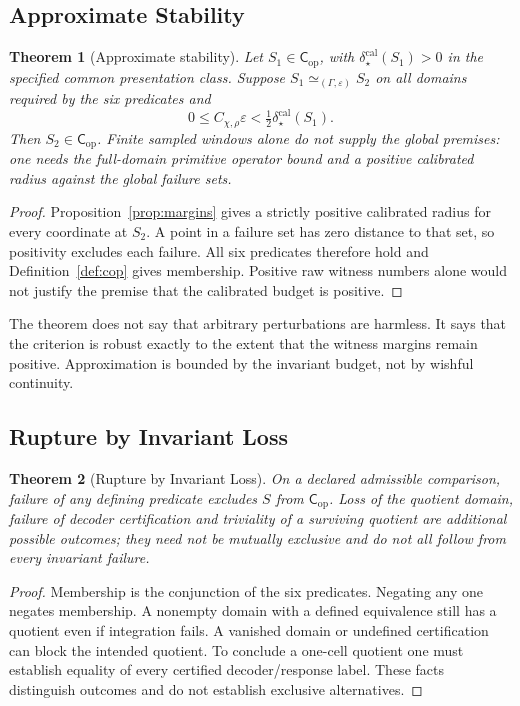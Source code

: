 \documentclass[11pt,a4paper]{article}
\newtheorem{theorem}{Theorem}[section]
\theoremstyle{definition}
\newcommand{\Cop}{\mathsf{C}_{\mathrm{op}}}
\newcommand{\eps}{\varepsilon}
\begin{document}
\subsection{Approximate Stability}
\begin{theorem}[Approximate stability]\label{thm:stability}
Let $S_1\in\Cop$, with $\delta_\star^{\mathrm{cal}}(S_1)>0$ in the specified common presentation class. Suppose $S_1\simeq_{(\Gamma,\eps)}S_2$ on all domains required by the six predicates and
\[
 0\le C_{\chi,\rho}\eps<\tfrac12\delta_\star^{\mathrm{cal}}(S_1).
\]
Then $S_2\in\Cop$. Finite sampled windows alone do not supply the global premises: one needs the full-domain primitive operator bound and a positive calibrated radius against the global failure sets.
\end{theorem}
\begin{proof}
Proposition~\ref{prop:margins} gives a strictly positive calibrated radius for every coordinate at $S_2$. A point in a failure set has zero distance to that set, so positivity excludes each failure. All six predicates therefore hold and Definition~\ref{def:cop} gives membership. Positive raw witness numbers alone would not justify the premise that the calibrated budget is positive.
\end{proof}

The theorem does not say that arbitrary perturbations are harmless. It says that the criterion is robust exactly to the extent that the witness margins remain positive. Approximation is bounded by the invariant budget, not by wishful continuity.

\subsection{Rupture by Invariant Loss}
\begin{theorem}[Rupture by Invariant Loss]\label{thm:rupture}
On a declared admissible comparison, failure of any defining predicate excludes $S$ from $\Cop$. Loss of the quotient domain, failure of decoder certification and triviality of a surviving quotient are additional possible outcomes; they need not be mutually exclusive and do not all follow from every invariant failure.
\end{theorem}
\begin{proof}
Membership is the conjunction of the six predicates. Negating any one negates membership. A nonempty domain with a defined equivalence still has a quotient even if integration fails. A vanished domain or undefined certification can block the intended quotient. To conclude a one-cell quotient one must establish equality of every certified decoder/response label. These facts distinguish outcomes and do not establish exclusive alternatives.
\end{proof}
\end{document}
